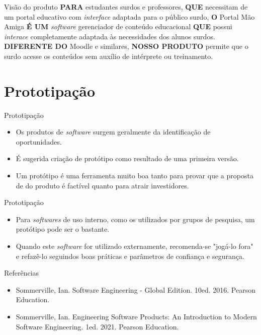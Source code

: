 \documentclass[11pt]{beamer}
\begin{document}
   \begin{frame}{Visão do produto}
      \textbf{PARA} estudantes surdos e professores, \textbf{QUE} necessitam de um portal educativo com \textit{interface} adaptada para o público surdo, \textbf{O} Portal Mão Amiga \textbf{É UM} \textit{software} gerenciador de conteúdo educacional \textbf{QUE} possui \textit{interace} completamente adaptada às necessidades dos alunos surdos. \textbf{DIFERENTE DO} Moodle e similares, \textbf{NOSSO PRODUTO} permite que o surdo acesse os conteúdos sem auxílio de intérprete ou treinamento.
   \end{frame}

   \section{Prototipação}

   \begin{frame}{Prototipação}
      \begin{itemize}
         \item Os produtos de \textit{software} surgem geralmente da identificação de oportunidades.
         \item É sugerida criação de protótipo como resultado de uma primeira versão.
         \item Um protótipo é uma ferramenta muito boa tanto para provar que a proposta de do produto é factível quanto para atrair investidores.
      \end{itemize}
   \end{frame}

   \begin{frame}{Prototipação}
      \begin{itemize}
         \item Para \textit{softwares} de uso interno, como os utilizados por grupos de pesquisa, um protótipo pode ser o bastante.
         \item Quando este \textit{software} for utilizado externamente, recomenda-se "jogá-lo fora" e refazê-lo seguindos boas práticas e parâmetros de confiança e segurança.
      \end{itemize}
   \end{frame}

   \begin{frame}{Referências}
      \begin{itemize}
          \item Sommerville, Ian. Software Engineering - Global Edition. 10ed. 2016. Pearson Education.
          \item Sommerville, Ian. Engineering Software Products: An Introduction to Modern Software Engineering. 1ed. 2021. Pearson Education. 
      \end{itemize}
   \end{frame}
\end{document}
